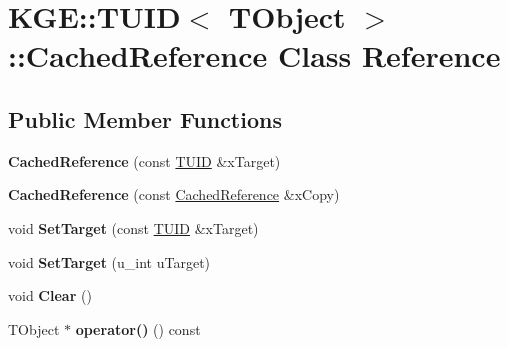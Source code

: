 \hypertarget{class_k_g_e_1_1_t_u_i_d_1_1_cached_reference}{\section{K\-G\-E\-:\-:T\-U\-I\-D$<$ T\-Object $>$\-:\-:Cached\-Reference Class Reference}
\label{class_k_g_e_1_1_t_u_i_d_1_1_cached_reference}
}
\subsection*{Public Member Functions}
\begin{DoxyCompactItemize}
\item 
\hypertarget{class_k_g_e_1_1_t_u_i_d_1_1_cached_reference_a57a5ea445a11f21b9e9543f7fd6ca3bd}{{\bfseries Cached\-Reference} (const \hyperlink{class_k_g_e_1_1_t_u_i_d}{T\-U\-I\-D} \&x\-Target)}\label{class_k_g_e_1_1_t_u_i_d_1_1_cached_reference_a57a5ea445a11f21b9e9543f7fd6ca3bd}

\item 
\hypertarget{class_k_g_e_1_1_t_u_i_d_1_1_cached_reference_a280be533d28e96b6df4a64b0e5244930}{{\bfseries Cached\-Reference} (const \hyperlink{class_k_g_e_1_1_t_u_i_d_1_1_cached_reference}{Cached\-Reference} \&x\-Copy)}\label{class_k_g_e_1_1_t_u_i_d_1_1_cached_reference_a280be533d28e96b6df4a64b0e5244930}

\item 
\hypertarget{class_k_g_e_1_1_t_u_i_d_1_1_cached_reference_a3b79bbdc9eeba5636443491c51c5ca6b}{void {\bfseries Set\-Target} (const \hyperlink{class_k_g_e_1_1_t_u_i_d}{T\-U\-I\-D} \&x\-Target)}\label{class_k_g_e_1_1_t_u_i_d_1_1_cached_reference_a3b79bbdc9eeba5636443491c51c5ca6b}

\item 
\hypertarget{class_k_g_e_1_1_t_u_i_d_1_1_cached_reference_a890c066db5400b75f6c5eb6e4ef4b032}{void {\bfseries Set\-Target} (u\-\_\-int u\-Target)}\label{class_k_g_e_1_1_t_u_i_d_1_1_cached_reference_a890c066db5400b75f6c5eb6e4ef4b032}

\item 
\hypertarget{class_k_g_e_1_1_t_u_i_d_1_1_cached_reference_a8a81fcf570352af92e85598339edfb28}{void {\bfseries Clear} ()}\label{class_k_g_e_1_1_t_u_i_d_1_1_cached_reference_a8a81fcf570352af92e85598339edfb28}

\item 
\hypertarget{class_k_g_e_1_1_t_u_i_d_1_1_cached_reference_ac5a30e7a46bc0594f473edc7083ffbe4}{T\-Object $\ast$ {\bfseries operator()} () const }\label{class_k_g_e_1_1_t_u_i_d_1_1_cached_reference_ac5a30e7a46bc0594f473edc7083ffbe4}

\end{DoxyCompactItemize}
